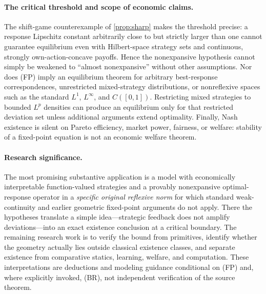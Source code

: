 \documentclass[11pt]{article}
\theoremstyle{definition}\newtheorem{definition}[theorem]{Definition}
\begin{document}
\paragraph{The critical threshold and scope of economic claims.}
The shift-game counterexample of \cref{prop:sharp} makes the threshold precise: a response Lipschitz constant arbitrarily close to but strictly larger than one cannot guarantee equilibrium even with Hilbert-space strategy sets and continuous, strongly own-action-concave payoffs. Hence the nonexpansive hypothesis cannot simply be weakened to ``almost nonexpansive'' without other assumptions. Nor does (FP) imply an equilibrium theorem for arbitrary best-response correspondences, unrestricted mixed-strategy distributions, or nonreflexive spaces such as the standard $L^1$, $L^\infty$, and $C([0,1])$. Restricting mixed strategies to bounded $L^p$ densities can produce an equilibrium only for that restricted deviation set unless additional arguments extend optimality. Finally, Nash existence is silent on Pareto efficiency, market power, fairness, or welfare: stability of a fixed-point equation is not an economic welfare theorem.

\paragraph{Research significance.}
The most promising substantive application is a model with economically interpretable function-valued strategies and a provably nonexpansive optimal-response operator in a \emph{specific original reflexive norm} for which standard weak-continuity and earlier geometric fixed-point arguments do not apply. There the hypotheses translate a simple idea---strategic feedback does not amplify deviations---into an exact existence conclusion at a critical boundary. The remaining research work is to verify the bound from primitives, identify whether the geometry actually lies outside classical existence classes, and separate existence from comparative statics, learning, welfare, and computation. These interpretations are deductions and modeling guidance conditional on (FP) and, where explicitly invoked, (BR), not independent verification of the source theorem.
\end{document}
